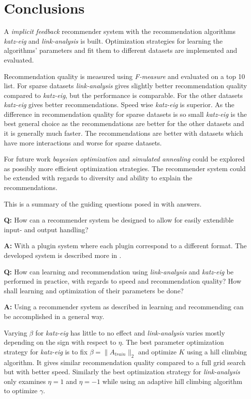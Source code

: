 \chapter{Conclusions}\label{cha:conclusions}

A \textit{implicit feedback} recommender system with the recommendation algorithms \textit{katz-eig} and \textit{link-analysis} is built. Optimization strategies for learning the algorithms' parameters and fit them to different datasets are implemented and evaluated.

Recommendation quality is measured using \textit{F-measure} and evaluated on a top 10 list.  For sparse datasets \textit{link-analysis} gives slightly better recommendation quality compared to \textit{katz-eig}, but the performance is comparable. For the other datasets \textit{katz-eig} gives better recommendations. Speed wise \textit{katz-eig} is superior.  As the difference in recommendation quality for sparse datasets is so small \textit{katz-eig} is the best general choice as the recommendations are better for the other datasets and it is generally much faster.  The recommendations are better with datasets which have more interactions and worse for sparse datasets.

For future work \textit{bayesian optimization} and \textit{simulated annealing} could be explored as possibly more efficient optimization strategies.  The recommender system could be extended with regards to diversity and ability to explain the recommendations.

\newpage

This is a summary of the guiding questions posed in  with answers.

\textbf{Q:} How can a recommender system be designed to allow for easily extendible input- and output handling?

\textbf{A:} With a plugin system where each plugin correspond to a different format. The developed system is described more in .


\textbf{Q:} How can learning and recommendation using \textit{link-analysis} and \textit{katz-eig} be performed in practice, with regards to speed and recommendation quality?
How shall learning and optimization of their parameters be done?

\textbf{A:} Using a recommender system as described in  learning and recommending can be accomplished in a general way.

Varying $\beta$ for \textit{katz-eig} has little to no effect and \textit{link-analysis} varies mostly depending on the sign with respect to $\eta$. The best parameter optimization strategy for \textit{katz-eig} is to fix $\beta = \| A_{train}\|_2$ and optimize $K$ using a hill climbing algorithm. It gives similar recommendation quality compared to a full grid search but with better speed. Similarly the best optimization strategy for \textit{link-analysis} only examines $\eta = 1$ and $\eta = -1$ while using an adaptive hill climbing algorithm to optimize $\gamma$.

